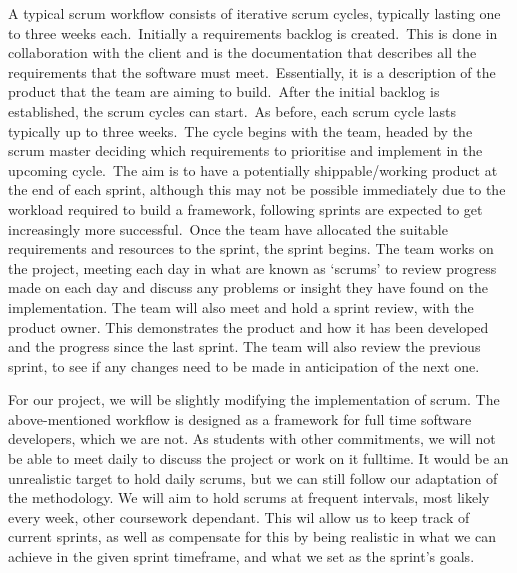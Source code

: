             A typical scrum workflow consists of iterative scrum cycles, typically lasting one to three weeks each.\
            Initially a requirements backlog is created.\ This is done in collaboration with the client and is the
            documentation that describes all the requirements that the software must meet.\ Essentially, it is a
            description of the product that the team are aiming to build.\ After the initial backlog is established, the
            scrum cycles can start.\ As before, each scrum cycle lasts typically up to three weeks.\ The cycle begins
            with the team, headed by the scrum master deciding which requirements to prioritise and implement in the
            upcoming cycle.\ The aim is to have a potentially shippable/working product at the end of each sprint,
            although this may not be possible immediately due to the workload required to build a framework, following
            sprints are expected to get increasingly more successful.\ Once the team have allocated the suitable
            requirements and resources to the sprint, the sprint begins. The team works on the project, meeting each day
            in what are known as ‘scrums’ to review progress made on each day and discuss any problems or insight they
            have found on the implementation. The team will also meet and hold a sprint review, with the product owner.
            This demonstrates the product and how it has been developed and the progress since the last sprint. The team
            will also review the previous sprint, to see if any changes need to be made in anticipation of the next
            one.\cite{nuevo_2011_scrumbased}

            For our project, we will be slightly modifying the implementation of scrum. The above-mentioned workflow is
            designed as a framework for full time software developers, which we are not. As students with other
            commitments, we will not be able to meet daily to discuss the project or work on it fulltime. It would be an
            unrealistic target to hold daily scrums, but we can still follow our adaptation of the methodology. We will
            aim to hold scrums at frequent intervals, most likely every week, other coursework dependant. This wil allow
            us to keep track of current sprints, as well as compensate for this by being realistic in what we can
            achieve in the given sprint timeframe, and what we set as the sprint’s goals.

